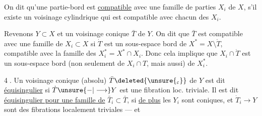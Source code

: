 On dit qu'une partie-bord  est \uline{compatible} avec
une famille de parties $X_i$ de $X$, s'il
existe un voisinage cylindrique qui est
compatible  avec chacun des $X_i$.

Revenons  $Y\subset X$ et un voisinage
conique  $\bar T$ de $Y$. On dit que $\bar T$ est
 compatible avec une famille de $X_i\subset X$
si 
$\dot T$ est un sous-espace bord de
$X^*=X\setminus\mathring T$, compatible avec la famille des
$X_i^*=X^*\cap X_i$. Donc cela implique que
$X_i\cap\dot T$ est un sous-espace bord (non seulement
de $X_i\cap T$, mais aussi) de $X_i^*$.

\textcircled{4}.  Un voisinage conique (absolu)
$\bar T\deleted{\unsure{_\varepsilon}}$ de
$Y$ est dit \uline{équisingulier} si $\dot T\unsure{-|\longrightarrow}Y$ est une
fibration loc. triviale. Il est dit \uline{équisingulier
pour une famille de} $\bar T_i\subset\bar T$, si \uline{de plus}
les $Y_i$ sont coniques, et $\dot T_i\longrightarrow Y$ sont des
fibrations localement triviales --- et 
